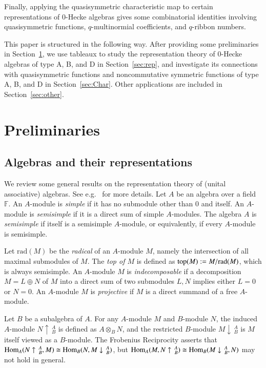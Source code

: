 \documentclass{amsart}
\newtheorem*{Young's Rule}{Young's Rule}
\theoremstyle{definition}
\theoremstyle{remark}
\numberwithin{equation}{section}
\begin{document}
Finally, applying the quasisymmetric characteristic map to certain representations of 0-Hecke algebras gives some combinatorial identities involving quasisymmetric functions, $q$-multinormial coefficients, and $q$-ribbon numbers. 

This paper is structured in the following way. After providing some preliminaries in Section~\ref{sec:pre}, we use tableaux to study the representation theory of 0-Hecke algebras of type A, B, and D in Section~\ref{sec:rep}, and investigate its connections with quasisymmetric functions and noncommutative symmetric functions of type A, B, and D in Section~\ref{sec:Char}. Other applications are included in Section~\ref{sec:other}. 

\section{Preliminaries}\label{sec:pre}

\subsection{Algebras and their representations}\label{sec:algebra}

We review some general results on the representation theory of (unital associative) algebras. See e.g.~\cite[\S I]{ASS} for more details. Let $A$ be an algebra over a field ${{\mathbb F}}$. An $A$-module is \emph{simple} if it has no submodule other than $0$ and itself. An $A$-module is \emph{semisimple} if it is a direct sum of simple $A$-modules. The algebra $A$ is \emph{semisimple} if itself is a semisimple $A$-module, or equivalently, if every $A$-module is semisimple. 

Let ${\mathrm{rad}}(M)$ be the \emph{radical} of an $A$-module $M$, namely the intersection of all maximal submodules of $M$. The \emph{top of $M$} is defined as ${\rm top}(M):=M/{\mathrm{rad}}(M)$, which is always semisimple. An $A$-module $M$ is \emph{indecomposable} if a decomposition $M=L\oplus N$ of $M$ into a direct sum of two submodules $L,N$ implies either $L=0$ or $N=0$. An $A$-module $M$ is \emph{projective} if $M$ is a direct summand of a free $A$-module.

Let $B$ be a subalgebra of $A$. For any $A$-module $M$ and $B$-module $N$, the induced $A$-module $N\uparrow\,_B^A$ is defined as $A\otimes_B N$, and the restricted $B$-module $M\downarrow\,_B^A$ is $M$ itself viewed as a $B$-module. The Frobenius Reciprocity asserts that ${\rm Hom}_A(N\uparrow\,_B^A,M) \cong {\rm Hom}_B(N,M\downarrow\,_B^A)$, but ${\rm Hom}_A(M, N\uparrow\,_B^A) \cong {\rm Hom}_B(M\downarrow\,_B^A,N)$ may not hold in general.
\end{document}
